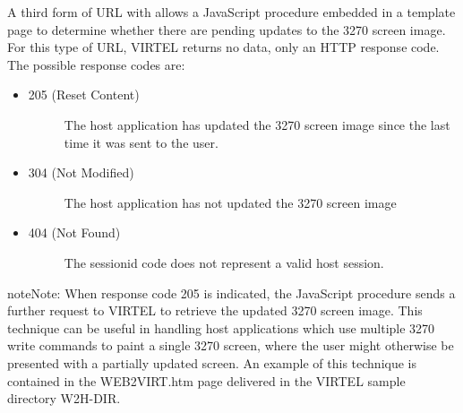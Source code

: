 \documentclass[letterpaper,10pt,english]{sphinxmanual}
\begin{document}
A third form of URL with  allows a JavaScript procedure embedded in a template page to determine whether there are pending updates to the 3270 screen image. For this type of URL, VIRTEL returns no data, only an HTTP response code. The possible response codes are:
\begin{itemize}
\item {} \begin{description}
\item[{205 (Reset Content)}] \leavevmode
The host application has updated the 3270 screen image since the last time it was sent to the user.

\end{description}

\item {} \begin{description}
\item[{304 (Not Modified)}] \leavevmode
The host application has not updated the 3270 screen image

\end{description}

\item {} \begin{description}
\item[{404 (Not Found)}] \leavevmode
The sessionid code does not represent a valid host session.

\end{description}

\end{itemize}

\begin{sphinxadmonition}{note}{Note:}
When response code 205 is indicated, the JavaScript procedure sends a further request to VIRTEL to retrieve the updated 3270 screen image. This technique can be useful in handling host applications
which use multiple 3270 write commands to paint a single 3270 screen, where the user might otherwise be presented with a partially updated screen. An example of this technique is contained in the
WEB2VIRT.htm page delivered in the VIRTEL sample directory W2H-DIR.
\end{sphinxadmonition}
\end{document}
